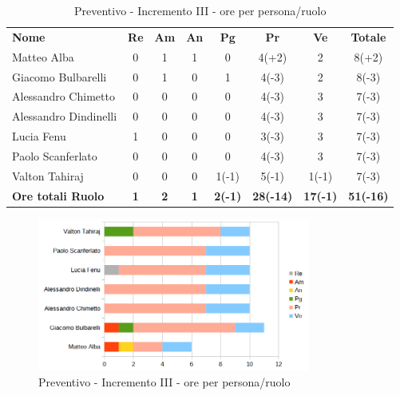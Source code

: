 \begin{table} [h!]
	\begin{center}
		\begin{tabular} { m{3.5cm} c c c c c c c }
			\rowcolor{lightgray}
			\textbf{Nome} & \textbf{Re} & \textbf{Am} & \textbf{An} & \textbf{Pg} & \textbf{Pr} & \textbf{Ve} & \textbf{Totale} \\
			Matteo Alba & 0 & 1 & 1 & 0 & 4(+2) & 2 & 8(+2) \\
			Giacomo Bulbarelli & 0 & 1 & 0 & 1 & 4(-3) & 2 & 8(-3) \\
			Alessandro Chimetto & 0 & 0 & 0 & 0 & 4(-3) & 3 & 7(-3)\\
			Alessandro Dindinelli & 0 & 0 & 0 & 0 & 4(-3) & 3 & 7(-3) \\
			Lucia Fenu & 1 & 0 & 0 & 0 & 3(-3) & 3 & 7(-3) \\
			Paolo Scanferlato & 0 & 0 & 0 & 0 & 4(-3) & 3 & 7(-3) \\
			Valton Tahiraj & 0 & 0 & 0 & 1(-1) & 5(-1) & 1(-1) & 7(-3) \\
			\textbf{Ore totali Ruolo} & \textbf{1} & \textbf{2} & \textbf{1} & \textbf{2(-1)} & \textbf{28(-14)}& \textbf{17(-1)} & \textbf{51(-16)}
		\end{tabular}
		\caption{Preventivo - Incremento III - ore per persona/ruolo}
	\end{center}
\end{table}
\begin{figure} [h!]
	\centering
	\includegraphics[width=0.8\textwidth]{res/img/grafici/consuntivo-barre- incremento3.png}
	\caption{Preventivo - Incremento III - ore per persona/ruolo} 
\end{figure}

\newpage

